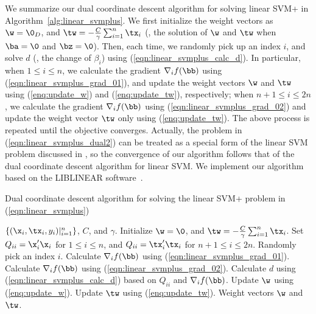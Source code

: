 We summarize our dual coordinate descent algorithm for solving linear SVM+ in Algorithm~\ref{alg:linear_svmplus}. We first initialize the weight vectors as $\w = \0_{D}$, and $\tw = -\frac{C}{\gamma}\sum_{i=1}^n\tx_i$ (\ie, the solution of $\w$ and $\tw$ when $\ba = \0$ and $\bz = \0$). Then, each time, we randomly pick up an index $i$, and solve $d$ (\ie, the change of $\beta_i$) using (\ref{eqn:linear_svmplus_calc_d}). In particular, when $1 \leq i \leq n$, we calculate the gradient $\nabla_if(\bb)$ using (\ref{eqn:linear_svmplus_grad_01}), and update the weight vectors $\w$ and $\tw$ using (\ref{enq:update_w}) and (\ref{enq:update_tw}), respectively; when $n+1 \leq i \leq 2n$, we calculate the gradient $\nabla_if(\bb)$ using (\ref{eqn:linear_svmplus_grad_02}) and update the weight vector $\tw$ only using (\ref{enq:update_tw}). The above process is repeated until the objective converges. Actually, the problem in (\ref{eqn:linear_svmplus_dual2}) can be treated as a special form of the linear SVM problem discussed in \cite{DCD_linearsvm}, so the convergence of our algorithm follows that of the dual coordinate descent algorithm for linear SVM. We implement our algorithm based on the LIBLINEAR software~\cite{liblinear}.
\begin{algorithm}[t]
   \caption{Dual coordinate descent algorithm for solving the linear SVM+ problem in (\ref{eqn:linear_svmplus})}
   \label{alg:linear_svmplus}
   \begin{algorithmic}[1]
   \REQUIRE  $\{(\x_i, \tx_i, y_i)|_{i=1}^n\}$,  $C$, and $\gamma$.
   \STATE Initialize $\w = \0$, and $\tw = -\frac{C}{\gamma}\sum_{i=1}^n\tx_i$.
   \STATE Set $Q_{ii} = \x_i'\x_i$ for $1 \leq i \leq n$, and $Q_{ii} = \tx_i'\tx_i$ for $n+1\leq i \leq 2n$.
   \REPEAT
      \STATE Randomly pick an index $i$.
      \STATE  Calculate $\nabla_if(\bb)$ using (\ref{eqn:linear_svmplus_grad_01}).
      \ELSE
      \STATE  Calculate $\nabla_if(\bb)$ using (\ref{eqn:linear_svmplus_grad_02}).
      \ENDIF
      \STATE Calculate $d$ using (\ref{eqn:linear_svmplus_calc_d}) based on $Q_{ii}$ and $\nabla_if(\bb)$.
        \STATE       Update $\w$ using (\ref{enq:update_w}).
      \ENDIF
      \STATE Update $\tw$ using (\ref{enq:update_tw}).
   \ENSURE Weight vectors $\w$ and $\tw$.
\end{algorithmic}
\end{algorithm}

